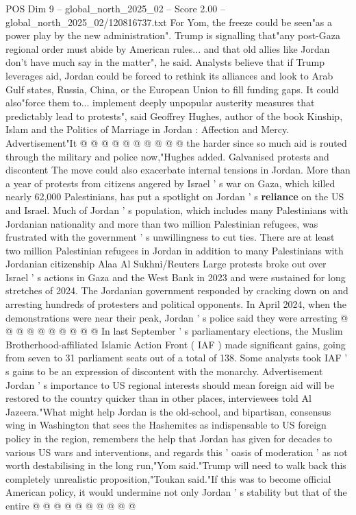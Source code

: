 \begin{textsample}{POS Dim 9 – global\_north\_2025\_02 – Score 2.00 – global\_north\_2025\_02/120816737.txt}
For Yom, the freeze could be seen"as a power play by the new administration".
Trump is signalling that"any post-Gaza regional order must abide by American rules... and that old allies like Jordan don't have much say in the matter", he said.
Analysts believe that if Trump leverages aid, Jordan could be forced to rethink its alliances and look to Arab Gulf states, Russia, China, or the European Union to fill funding gaps.
It could also"force them to... implement deeply unpopular austerity measures that predictably lead to protests", said Geoffrey Hughes, author of the book Kinship, Islam and the Politics of Marriage in Jordan : Affection and Mercy.
Advertisement"It @ @ @ @ @ @ @ @ @ @ the harder since so much aid is routed through the military and police now,"Hughes added.
Galvanised protests and discontent The move could also exacerbate internal tensions in Jordan.
More than a year of protests from citizens angered by Israel ' s war on Gaza, which killed nearly 62,000 Palestinians, has put a spotlight on Jordan ' s \textbf{reliance} on the US and Israel.
Much of Jordan ' s population, which includes many Palestinians with Jordanian nationality and more than two million Palestinian refugees, was frustrated with the government ' s unwillingness to cut ties.
There are at least two million Palestinian refugees in Jordan in addition to many Palestinians with Jordanian citizenship Alaa Al Sukhni/Reuters Large protests broke out over Israel ' s actions in Gaza and the West Bank in 2023 and were sustained for long stretches of 2024.
The Jordanian government responded by cracking down on and arresting hundreds of protesters and political opponents.
In April 2024, when the demonstrations were near their peak, Jordan ' s police said they were arresting @ @ @ @ @ @ @ @ @ @ In last September ' s parliamentary elections, the Muslim Brotherhood-affiliated Islamic Action Front ( IAF ) made significant gains, going from seven to 31 parliament seats out of a total of 138.
Some analysts took IAF ' s gains to be an expression of discontent with the monarchy.
Advertisement Jordan ' s importance to US regional interests should mean foreign aid will be restored to the country quicker than in other places, interviewees told Al Jazeera."What might help Jordan is the old-school, and bipartisan, consensus wing in Washington that sees the Hashemites as indispensable to US foreign policy in the region, remembers the help that Jordan has given for decades to various US wars and interventions, and regards this ' oasis of moderation ' as not worth destabilising in the long run,"Yom said."Trump will need to walk back this completely unrealistic proposition,"Toukan said."If this was to become official American policy, it would undermine not only Jordan ' s stability but that of the entire @ @ @ @ @ @ @ @ @ @

\end{textsample}
